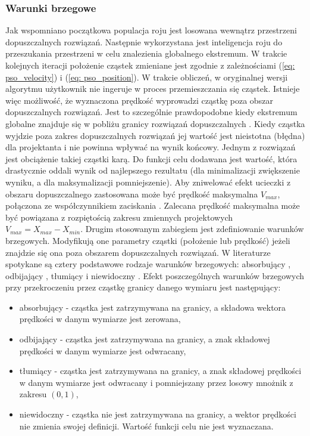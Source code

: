 %
\subsubsection{Warunki brzegowe}
Jak wspomniano początkowa populacja roju jest losowana wewnątrz przestrzeni dopuszczalnych rozwiązań. Następnie wykorzystana jest inteligencja roju do przeszukania przestrzeni w celu znalezienia globalnego ekstremum. W trakcie kolejnych iteracji położenie cząstek zmieniane jest zgodnie z zależnościami (\ref{eq: pso_velocity}) i (\ref{eq: pso_position}). W trakcie obliczeń, w oryginalnej wersji algorytmu użytkownik nie ingeruje w proces przemieszczania się cząstek. Istnieje więc możliwość, że wyznaczona prędkość wyprowadzi cząstkę poza obszar dopuszczalnych rozwiązań. Jest to szczególnie prawdopodobne kiedy ekstremum globalne znajduje się w pobliżu granicy rozwiązań dopuszczalnych \parencite{Xu2007}. Kiedy cząstka wyjdzie poza zakres dopuszczalnych rozwiązań jej wartość jest nieistotna (błędna) dla projektanta i nie powinna wpływać na wynik końcowy. Jednym z rozwiązań jest obciążenie takiej cząstki karą. Do funkcji celu dodawana jest wartość, która drastycznie oddali wynik od najlepszego rezultatu (dla minimalizacji zwiększenie wyniku, a dla maksymalizacji pomniejszenie). 
Aby zniwelować efekt ucieczki z obszaru dopuszczalnego zastosowana może być prędkość maksymalna $V_{max}$, połączona ze współczynnikiem zaciskania \parencite{Eberhart2001a}. Zalecana prędkość maksymalna może być powiązana z rozpiętością zakresu zmiennych projektowych $V_{max}=X_{max}-X_{min}$. Drugim stosowanym zabiegiem jest zdefiniowanie warunków brzegowych. Modyfikują one parametry cząstki (położenie lub prędkość) jeżeli znajdzie się ona poza obszarem dopuszczalnych rozwiązań. W literaturze spotykane są cztery podstawowe rodzaje warunków brzegowych: absorbujący , odbijający , tłumiący  i niewidoczny  \parencite{Robinson2004,Huang2005}. Efekt poszczególnych warunków brzegowych przy przekroczeniu przez cząstkę granicy danego wymiaru jest następujący:
\begin{itemize}
	\item absorbujący - cząstka jest zatrzymywana na granicy, a składowa wektora prędkości w danym wymiarze jest zerowana,
	\item odbijający -  cząstka jest zatrzymywana na granicy, a znak składowej prędkości w danym wymiarze jest odwracany,
	\item tłumiący - cząstka jest zatrzymywana na granicy, a znak składowej prędkości w danym wymiarze jest odwracany i pomniejszany przez losowy mnożnik z zakresu $(0,1)$,
	\item niewidoczny - cząstka nie jest zatrzymywana na granicy, a wektor prędkości nie zmienia swojej definicji. Wartość funkcji celu nie jest wyznaczana.
\end{itemize} 
